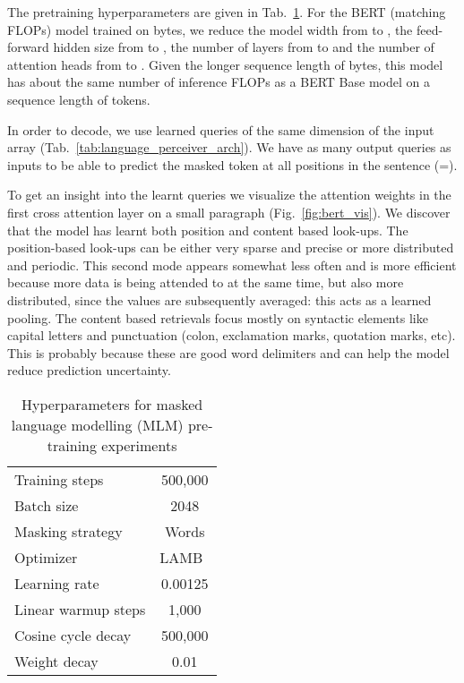 \documentclass{article} \usepackage{iclr2022_conference,times}
\begin{document}
The pretraining hyperparameters are given in Tab.~\ref{tab:language_pretrain_hypers}. For the BERT (matching FLOPs) model trained on bytes, we reduce the model width from  to , the feed-forward hidden size from  to , the number of layers from  to  and the number of attention heads from  to . Given the longer sequence length of  bytes, this model has about the same number of inference FLOPs as a BERT Base model on a sequence length of  tokens.

In order to decode, we use learned queries of the same dimension of the input array (Tab.~\ref{tab:language_perceiver_arch}). 
We have as many output queries as inputs to be able to predict the masked token at all positions in the sentence (=).

To get an insight into the learnt queries we visualize the attention weights in the first cross attention layer on a small paragraph (Fig.~\ref{fig:bert_vis}). We discover that the model has learnt both position and content based look-ups. The position-based look-ups can be either very sparse and precise or more distributed and periodic. This second mode appears somewhat less often and is more efficient because more data is being attended to at the same time, but also more distributed, since the values are subsequently averaged: this acts as a learned pooling. The content based retrievals focus mostly on syntactic elements like capital letters and punctuation (colon, exclamation marks, quotation marks, etc). This is probably because these are good word delimiters and can help the model reduce prediction uncertainty.
\begin{table}[h]
\centering
 \begin{tabular}{l c}
 \toprule
Training steps & 500,000 \\
Batch size & 2048 \\
Masking strategy & Words \\
\midrule
Optimizer & LAMB~\citep{you2019lamb} \\
Learning rate & 0.00125  \\
Linear warmup steps & 1,000 \\
Cosine cycle decay & 500,000 \\
Weight decay & 0.01 \\
 \bottomrule
\end{tabular}
\vspace{1mm}
\caption{\small \label{tab:language_pretrain_hypers} Hyperparameters for masked language modelling (MLM) pre-training experiments}
\end{table}
\end{document}
